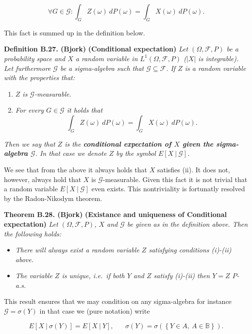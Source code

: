 \documentclass[
]{book}
\providecommand{\tightlist}{%
  \setlength{\itemsep}{0pt}\setlength{\parskip}{0pt}}
\begin{document}
\[
\forall G\in\mathcal{G} : \int_G Z(\omega)\ dP(\omega)=\int_G X(\omega)\ dP(\omega).
\]

This fact is summed up in the definition below.

\textbf{Definition B.27. (Bjork)} \textbf{(Conditional expectation)} \emph{Let \((\Omega,\mathcal{F},P)\) be a probability space and \(X\) a random variable in \(L^1(\Omega,\mathcal{F},P)\) (\(\vert X\vert\) is integrable). Let furthermore \(\mathcal{G}\) be a sigma-algebra such that \(\mathcal{G}\subseteq \mathcal{F}\). If \(Z\) is a random variable with the properties that:}

\begin{enumerate}
\def\labelenumi{\roman{enumi}.}
\tightlist
\item
  \emph{\(Z\) is \(\mathcal{G}\)-measurable.}
\item
  \emph{For every \(G\in\mathcal{G}\) it holds that}
  \[\int_G Z(\omega)\ dP(\omega)=\int_G X(\omega)\ dP(\omega).\tag{B.5}\]
\end{enumerate}

\emph{Then we say that \(Z\) is the \textbf{conditional expectation of \(X\) given the sigma-algebra \(\mathcal{G}\)}. In that case we denote \(Z\) by the symbol \(E[X\ \vert\ \mathcal{G}]\).}

We see that from the above it always holds that \(X\) satisfies (ii). It does not, however, always hold that \(X\) is \(\mathcal{G}\)-measurable. Given this fact it is not trivial that a random variable \(E[X\ \vert\ \mathcal{G}]\) even exists. This nontriviality is fortunatly resolved by the Radon-Nikodym theorem.

\textbf{Theorem B.28. (Bjork)} \textbf{(Existance and uniqueness of Conditional expectation)} \emph{Let \((\Omega,\mathcal{F},P)\), \(X\) and \(\mathcal{G}\) be given as in the definition above. Then the following holds:}

\begin{itemize}
\tightlist
\item
  \emph{There will always exist a random variable \(Z\) satisfying conditions (i)-(ii) above.}
\item
  \emph{The variable \(Z\) is unique, i.e.~if both \(Y\) and \(Z\) satisfy (i)-(ii) then \(Y=Z\) \(P\)-a.s.}
\end{itemize}

This result ensures that we may condition on any sigma-algebra for instance \(\mathcal{G}=\sigma(Y)\) in that case we (pure notation) write

\[
E[X\ \vert\ \sigma(Y)]=E[X\ \vert\ Y],\hspace{20pt}\sigma(Y)=\sigma\left(\left\{ Y\in A,\ A\in\mathbb{B}\right\}\right).
\]
\end{document}
